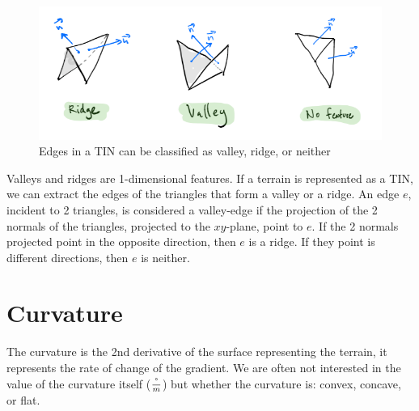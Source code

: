 \begin{figure}
  \centering
  \includegraphics[width=0.8\linewidth]{figs/valley_ridge}
  \caption{Edges in a TIN can be classified as valley, ridge, or neither}
\label{fig:valley_ridge}
\end{figure}
Valleys and ridges are 1-dimensional features.
If a terrain is represented as a TIN, we can extract the edges of the triangles that form a valley or a ridge.
An edge $e$, incident to 2 triangles, is considered a valley-edge if the projection of the 2 normals of the triangles, projected to the $xy$-plane, point to $e$.
If the 2 normals projected point in the opposite direction, then $e$ is a ridge.
If they point is different directions, then $e$ is neither.



%
\section{Curvature}

The curvature is the 2nd derivative of the surface representing the terrain, it represents the rate of change of the gradient.
We are often not interested in the value of the curvature itself ($\frac{\degree}{m}$) but whether the curvature is: convex, concave, or flat.

